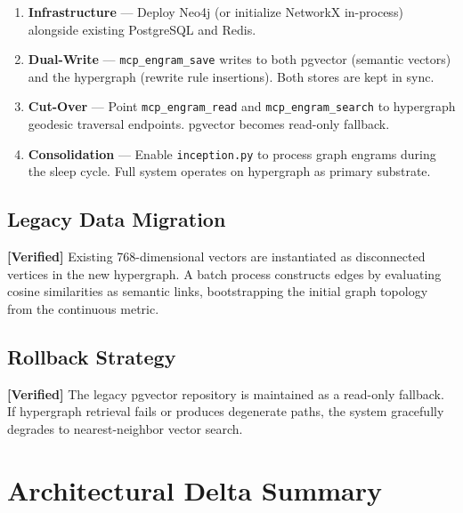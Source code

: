 \documentclass[11pt]{article}
\newcommand{\verified}{\textcolor{verifiedgreen}{\textbf{[Verified]}}}
\theoremstyle{definition}
\theoremstyle{remark}
\begin{document}
\begin{enumerate}[label=\textbf{Phase \arabic*:}, leftmargin=3.5em]
  \item \textbf{Infrastructure} --- Deploy Neo4j (or initialize NetworkX
    in-process) alongside existing PostgreSQL and Redis.

  \item \textbf{Dual-Write} --- \texttt{mcp\_engram\_save} writes to both
    pgvector (semantic vectors) and the hypergraph (rewrite rule insertions).
    Both stores are kept in sync.

  \item \textbf{Cut-Over} --- Point \texttt{mcp\_engram\_read} and
    \texttt{mcp\_engram\_search} to hypergraph geodesic traversal endpoints.
    pgvector becomes read-only fallback.

  \item \textbf{Consolidation} --- Enable \texttt{inception.py} to process
    graph engrams during the sleep cycle. Full system operates on hypergraph
    as primary substrate.
\end{enumerate}

\subsection{Legacy Data Migration}

\verified{} Existing 768-dimensional vectors are instantiated as disconnected
vertices in the new hypergraph. A batch process constructs edges by evaluating
cosine similarities as semantic links, bootstrapping the initial graph topology
from the continuous metric.

\subsection{Rollback Strategy}

\verified{} The legacy pgvector repository is maintained as a read-only
fallback. If hypergraph retrieval fails or produces degenerate paths, the
system gracefully degrades to nearest-neighbor vector search.

\newpage

\section{Architectural Delta Summary}
\label{sec:delta}
\end{document}
